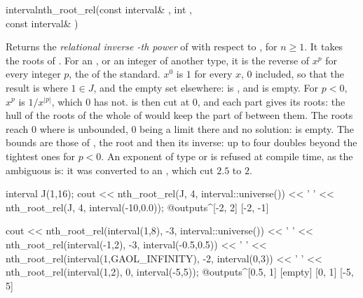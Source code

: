 \documentclass[12pt,a4paper,twoside,openright]{book}
\begin{document}
\begin{deffun}{interval}{nth\_root\_rel}{(const interval\& , int , \\\hbox{}\hfill const interval\& )}
  \begin{operation}
  \end{operation}
  Returns the \emph{relational inverse -th power} of  with
  respect to , for $n\geq1$. It takes the roots of
  .\newinvfive{} For an  , or an integer
  of another type, it is the reverse of $x^p$ for every integer $p$, the
   of the standard. $x^0$ is $1$ for every $x$, $0$ included,
  so that the result is  where $1\in J$, and the empty set elsewhere:
   is , and
   is empty. For $p<0$, $x^p$ is
  $1/x^{|p|}$, which $0$ has not.  is then cut at $0$, and each part
  gives its roots: the hull of the roots of the whole of  would keep
  the part of  between them. The roots reach $0$ where  is
  unbounded, $0$ being a limit there and no solution:
   is empty. The
  bounds are those of , the root and then its inverse:
  up to four doubles beyond the tightest ones for $p<0$. An exponent of type
   or  is refused at compile time, as the ambiguous
   is: it was converted to an ,
  which cut $2.5$ to $2$.
\begin{example}
interval J(1,16);
cout << nth_root_rel(J, 4, interval::universe()) << ' '
     << nth_root_rel(J, 4, interval(-10,0.0));
@outputs^[-2, 2] [-2, -1]~
\end{example}
\begin{example}
cout << nth_root_rel(interval(1,8), -3, interval::universe()) << ' '
     << nth_root_rel(interval(-1,2), -3, interval(-0.5,0.5)) << ' '
     << nth_root_rel(interval(1,GAOL_INFINITY), -2, interval(0,3)) << ' '
     << nth_root_rel(interval(1,2), 0, interval(-5,5));
@outputs^[0.5, 1] [empty] [0, 1] [-5, 5]~
\end{example}
\end{deffun}
\end{document}
